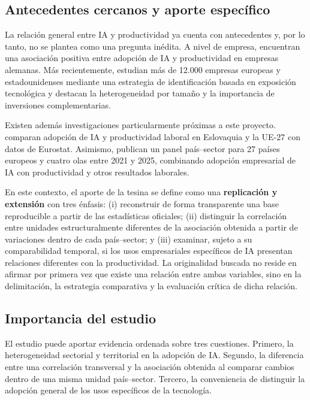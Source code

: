 \documentclass[12pt,a4paper]{article}
\begin{document}
\subsection{Antecedentes cercanos y aporte específico}

La relación general entre IA y productividad ya cuenta con antecedentes y, por lo tanto, no se plantea como una pregunta inédita. A nivel de empresa, \citet{czarnitzki2023firm} encuentran una asociación positiva entre adopción de IA y productividad en empresas alemanas. Más recientemente, \citet{aldasoro2026adoption} estudian más de 12.000 empresas europeas y estadounidenses mediante una estrategia de identificación basada en exposición tecnológica y destacan la heterogeneidad por tamaño y la importancia de inversiones complementarias.

Existen además investigaciones particularmente próximas a este proyecto. \citet{kadarova2026slovakia} comparan adopción de IA y productividad laboral en Eslovaquia y la UE-27 con datos de Eurostat. Asimismo, \citet{yilmaz2026dataset} publican un panel país--sector para 27 países europeos y cuatro olas entre 2021 y 2025, combinando adopción empresarial de IA con productividad y otros resultados laborales.

En este contexto, el aporte de la tesina se define como una \textbf{replicación y extensión} con tres énfasis: (i) reconstruir de forma transparente una base reproducible a partir de las estadísticas oficiales; (ii) distinguir la correlación entre unidades estructuralmente diferentes de la asociación obtenida a partir de variaciones dentro de cada país--sector; y (iii) examinar, sujeto a su comparabilidad temporal, si los usos empresariales específicos de IA presentan relaciones diferentes con la productividad. La originalidad buscada no reside en afirmar por primera vez que existe una relación entre ambas variables, sino en la delimitación, la estrategia comparativa y la evaluación crítica de dicha relación.

\subsection{Importancia del estudio}

El estudio puede aportar evidencia ordenada sobre tres cuestiones. Primero, la heterogeneidad sectorial y territorial en la adopción de IA. Segundo, la diferencia entre una correlación transversal y la asociación obtenida al comparar cambios dentro de una misma unidad país--sector. Tercero, la conveniencia de distinguir la adopción general de los usos específicos de la tecnología.
\end{document}
